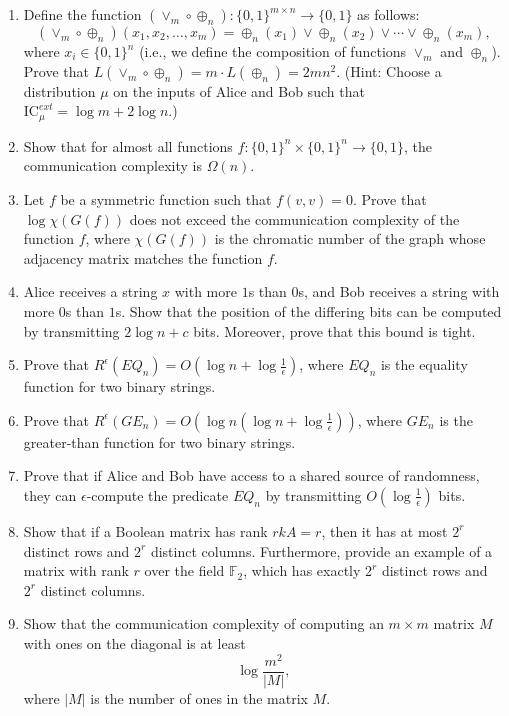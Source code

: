 \documentclass[a4paper,14pt]{extarticle}
\newcommand{\bits}{\{0,1\}}
\newcommand{\seqn}[2]{{#1}_1,{#1}_2,\dotsc,{#1}_{#2}}
\begin{document}
\begin{enumerate}
          \item
        Define the function $(\lor_m \circ \oplus_n) : \bits^{m \times n} \to \bits$ as follows:
        $$(\lor_m \circ \oplus_n)(\seqn{x}{m}) = \oplus_n(x_1) \lor \oplus_n(x_2) \lor \dotsb \lor \oplus_n(x_m),$$
        where $x_i \in \bits^n$ (i.e., we define the composition of functions $\lor_m$ and $\oplus_n$).
        Prove that $L(\lor_m \circ \oplus_n) = m \cdot L(\oplus_n) = 2mn^2$.
        (Hint: Choose a distribution $\mu$ on the inputs of Alice and Bob such that $\mathrm{IC}_\mu^{ext} = \log m + 2\log n$.)


        \item
        Show that for almost all functions $f : \{0,1\}^n \times \{0,1\}^n \to \{0,1\}$, the communication complexity is $\Omega(n)$.

        \item
        Let $f$ be a symmetric function such that $f(v, v) = 0$. Prove that $\log{\chi(G(f))}$ does not exceed the communication complexity of the function $f$, where $\chi(G(f))$ is the chromatic number of the graph whose adjacency matrix matches the function $f$.

        \item
        Alice receives a string $x$ with more $1$s than $0$s, and Bob receives a string with more $0$s than $1$s. Show that the position of the differing bits can be computed by transmitting $2\log n + c$ bits. Moreover, prove that this bound is tight.

        \item
        Prove that $R^{\epsilon}(EQ_n) = O(\log{n} + \log{\frac{1}{\epsilon}})$, where $EQ_n$ is the equality function for two binary strings.

        \item
        Prove that $R^{\epsilon}(GE_n) = O(\log{n}(\log{n} + \log{\frac{1}{\epsilon}}))$, where $GE_n$ is the greater-than function for two binary strings.

        \item
        Prove that if Alice and Bob have access to a shared source of randomness, they can $\epsilon$-compute the predicate $EQ_n$ by transmitting $O(\log{\frac{1}{\epsilon}})$ bits.

        \item
        Show that if a Boolean matrix has rank $rkA = r$, then it has at most $2^r$ distinct rows and $2^r$ distinct columns. Furthermore, provide an example of a matrix with rank $r$ over the field $\mathbb{F}_2$, which has exactly $2^r$ distinct rows and $2^r$ distinct columns.

        \item
        Show that the communication complexity of computing an $m \times m$ matrix $M$ with ones on the diagonal is at least
        $$\log{\frac{m^2}{|M|}},$$
        where $|M|$ is the number of ones in the matrix $M$.




\end{enumerate}
\end{document}
